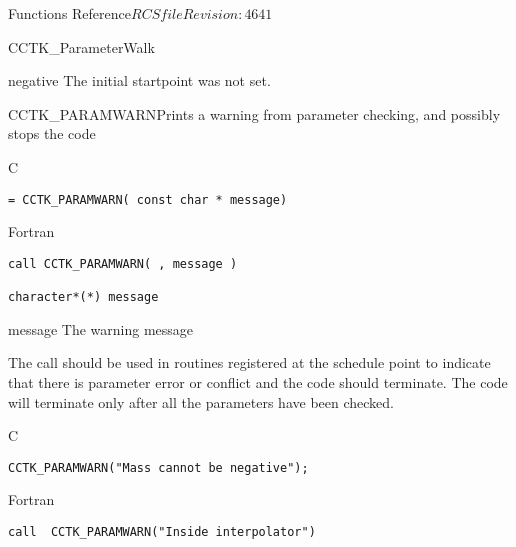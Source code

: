\begin{cactuspart}{ Functions Reference}{$RCSfile$}{$Revision: 4641 $}
\begin{FunctionDescription}{CCTK\_ParameterWalk}
\begin{ErrorSection}
\begin{Error}{negative}
The initial startpoint was not set.
\end{Error}
\end{ErrorSection}
\end{FunctionDescription}


\begin{FunctionDescription}{CCTK\_PARAMWARN}{Prints a warning from parameter checking, and possibly stops the code}
\label{CCTK-PARAMWARN}
\begin{SynopsisSection}
\begin{Synopsis}{C}
\begin{verbatim}= CCTK_PARAMWARN( const char * message)\end{verbatim}
\end{Synopsis}
\begin{Synopsis}{Fortran}
\begin{verbatim}call CCTK_PARAMWARN( , message )

character*(*) message\end{verbatim}
\end{Synopsis}
\end{SynopsisSection}
\begin{ParameterSection}
\begin{Parameter}{message}
The warning message
\end{Parameter}
\end{ParameterSection}
\begin{Discussion}
The call should be used in routines registered at the schedule point 
to indicate that there is parameter error or conflict and the code should
terminate. The code will terminate only after all the parameters have been
checked.
\end{Discussion}
\begin{ExampleSection}
\begin{Example}{C}
\begin{verbatim}
CCTK_PARAMWARN("Mass cannot be negative");
\end{verbatim}
\end{Example}
\begin{Example}{Fortran}
\begin{verbatim}
call  CCTK_PARAMWARN("Inside interpolator")
\end{verbatim}
\end{Example}
\end{ExampleSection}
\end{FunctionDescription}



\end{cactuspart}
